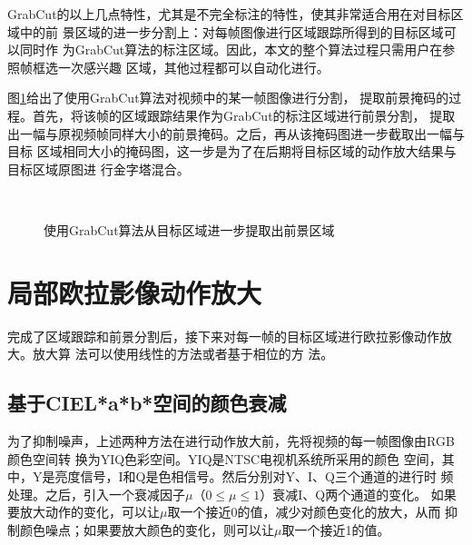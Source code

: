 GrabCut的以上几点特性，尤其是不完全标注的特性，使其非常适合用在对目标区域中的前
景区域的进一步分割上：对每帧图像进行区域跟踪所得到的目标区域可以同时作
为GrabCut算法的标注区域。因此，本文的整个算法过程只需用户在参照帧框选一次感兴趣
区域，其他过程都可以自动化进行。

图\ref{fig:grabcut-result}给出了使用GrabCut算法对视频中的某一帧图像进行分割，
提取前景掩码的过程。首先，将该帧的区域跟踪结果作为GrabCut的标注区域进行前景分割，
提取出一幅与原视频帧同样大小的前景掩码。之后，再从该掩码图进一步截取出一幅与目标
区域相同大小的掩码图，这一步是为了在后期将目标区域的动作放大结果与目标区域原图进
行金字塔混合。

\begin{figure}[htbp]
  \centering
  \qquad
  \qquad\\
  \qquad
  \qquad
  \caption{使用GrabCut算法从目标区域进一步提取出前景区域}
  \label{fig:grabcut-result}
\end{figure}

\section{局部欧拉影像动作放大}
\label{sec:local-evm}

完成了区域跟踪和前景分割后，接下来对每一帧的目标区域进行欧拉影像动作放大。放大算
法可以使用线性的方法或者基于相位的方
法。

\subsection{基于CIEL*a*b*空间的颜色衰减}
\label{sec:cielab}

为了抑制噪声，上述两种方法在进行动作放大前，先将视频的每一帧图像由RGB颜色空间转
换为YIQ色彩空间。YIQ是NTSC电视机系统所采用的颜色
空间，其中，Y是亮度信号，I和Q是色相信号。然后分别对Y、I、Q三个通道的进行时
频处理。之后，引入一个衰减因子$\mu$（$0\le \mu \le 1$）衰减I、Q两个通道的变化。
如果要放大动作的变化，可以让$\mu$取一个接近0的值，减少对颜色变化的放大，从而
抑制颜色噪点；如果要放大颜色的变化，则可以让$\mu$取一个接近1的值。

